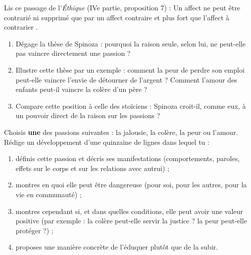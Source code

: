 \documentclass[11pt]{article}
\newcounter{popsec}
\newcounter{popsub}
\newcommand{\courssub}[1]{%
  \stepcounter{popsub}%
  \par\vspace{9pt}\noindent{\popxbold\fontsize{11.5}{13}\selectfont\color{popink}{\color{poporange}\thepopsec.\thepopsub}\hspace{6pt}#1}\par\nopagebreak\vspace{4pt}
}
\begin{document}
\begin{exercice}
Lis ce passage de l'\emph{Éthique} (IVe partie, proposition 7) : \guillemotleft Un affect ne peut être contrarié ni supprimé que par un affect contraire et plus fort que l'affect à contrarier \guillemotright.

\begin{enumerate}
\item Dégage la thèse de Spinoza : pourquoi la raison seule, selon lui, ne peut-elle pas vaincre directement une passion ?
\item Illustre cette thèse par un exemple : comment la peur de perdre son emploi peut-elle vaincre l'envie de détourner de l'argent ? Comment l'amour des enfants peut-il vaincre la colère d'un père ?
\item Compare cette position à celle des stoïciens : Spinoza croit-il, comme eux, à un pouvoir direct de la raison sur les passions ?
\end{enumerate}
\end{exercice}

\begin{exercice}
Choisis \textbf{une} des passions suivantes : la jalousie, la colère, la peur ou l'amour. Rédige un développement d'une quinzaine de lignes dans lequel tu :
\begin{enumerate}
\item définis cette passion et décris ses manifestations (comportements, paroles, effets sur le corps et sur les relations avec autrui) ;
\item montres en quoi elle peut être dangereuse (pour soi, pour les autres, pour la vie en communauté) ;
\item montres cependant si, et dans quelles conditions, elle peut avoir une valeur positive (par exemple : la colère peut-elle servir la justice ? la peur peut-elle protéger ?) ;
\item proposes une manière concrète de l'éduquer plutôt que de la subir.
\end{enumerate}
\end{exercice}

\courssub{Je me prépare au Bac}
\end{document}
